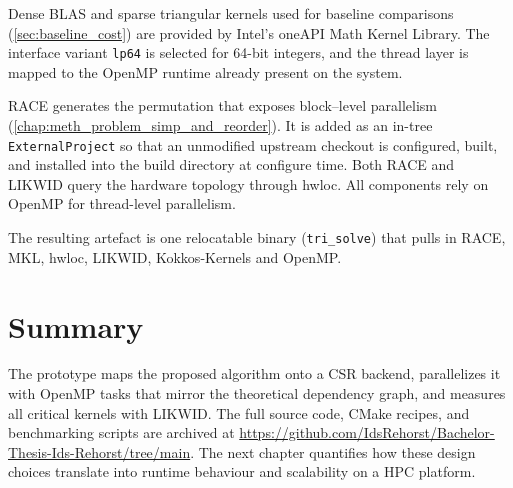 Dense BLAS and sparse triangular kernels used for baseline comparisons
(\ref{sec:baseline_cost})  
are provided by Intel’s oneAPI Math Kernel Library.
The interface variant \texttt{lp64} is selected for 64-bit integers, and
the thread layer is mapped to the OpenMP runtime already present on the
system.  

RACE generates the permutation that exposes block–level parallelism
(\ref{chap:meth_problem_simp_and_reorder}).
It is added as an in-tree \texttt{ExternalProject} so that an
unmodified upstream checkout is configured, built, and installed into the build
directory at configure time.  
Both RACE and LIKWID query the hardware topology through
hwloc.  
All components rely on OpenMP for thread-level parallelism.

The resulting artefact is one relocatable binary
(\texttt{tri\_solve}) that pulls in
RACE, MKL, hwloc, LIKWID, Kokkos-Kernels and OpenMP.

\section{Summary}
The prototype maps the proposed algorithm onto a CSR backend, parallelizes
it with OpenMP tasks that mirror the theoretical dependency graph, and
measures all critical kernels with LIKWID. The full source code, CMake recipes, and benchmarking scripts are archived
at \url{https://github.com/IdsRehorst/Bachelor-Thesis-Ids-Rehorst/tree/main}. The next chapter
quantifies how these design choices translate into runtime behaviour
and scalability on a HPC platform.

